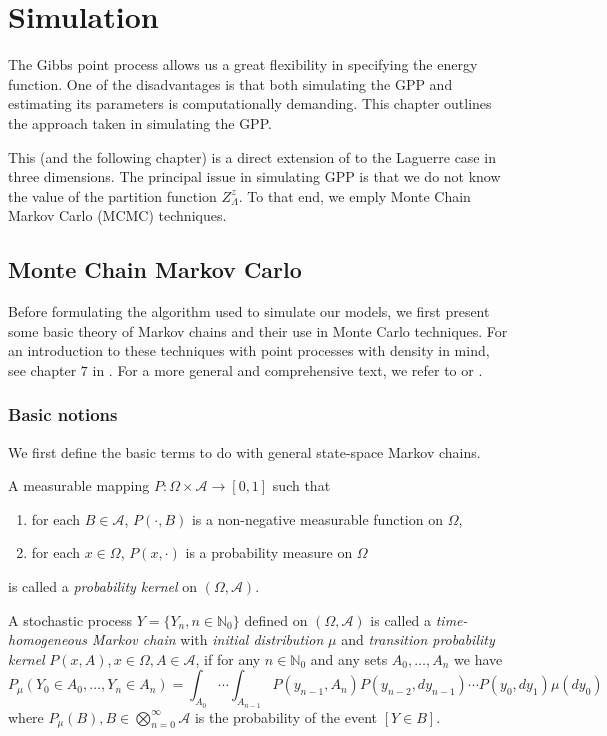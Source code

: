 \chapter{Simulation}
The Gibbs point process allows us a great flexibility in specifying the energy function. One of the disadvantages is that both simulating the GPP and estimating its parameters is computationally demanding. This chapter outlines the approach taken in simulating the GPP. 

This (and the following chapter) is a direct extension of \cite{DereudreLavancier2010} to the Laguerre case in three dimensions.
The principal issue in simulating GPP is that we do not know the value of the partition function $Z^z_\Lambda$. To that end, we emply Monte Chain Markov Carlo (MCMC) techniques.

\section{Monte Chain Markov Carlo}
Before formulating the algorithm used to simulate our models, we first present some basic theory of Markov chains and their use in Monte Carlo techniques. For an introduction to these techniques with point processes with density in mind, see chapter $7$ in \cite{MollerWaagepetersen2003}. For a more general and comprehensive text, we refer to \cite{RobertCasella2004} or \cite{MeynTweedie1993}.

\subsection{Basic notions}
We first define the basic terms to do with general state-space Markov chains.

\begin{definition}
A measurable mapping $P:\Omega\times \mathcal A \to [0,1]$ such that
\begin{enumerate}
\item for each $B \in \mathcal A$, $P(\cdot, B)$ is a non-negative measurable function on $\Omega$,
\item for each $x \in \Omega$, $P(x,\cdot)$ is a probability measure on $\Omega$
\end{enumerate}
is called a \textit{probability kernel} on $(\Omega, \mathcal A)$.
\end{definition}

\begin{definition} A stochastic process $Y=\{Y_n,n \in \mathbb N_0\}$ defined on $(\Omega,\mathcal A)$ is called a \textit{time-homogeneous Markov chain} with \textit{initial distribution} $\mu$ and \textit{transition probability kernel} $P(x,A),x\in\Omega,A \in \mathcal A$, if for any $n\in \mathbb N_0$ and any sets $A_0,\dots,A_n$ we have
$$P_\mu(Y_0\in A_0,\dots, Y_n \in A_n) = \int_{A_0} \cdots \int_{A_{n-1}} P(y_{n-1},A_n) P(y_{n-2},dy_{n-1}) \cdots P(y_0,dy_1)\mu(dy_0)$$
where $P_\mu(B), B \in \bigotimes^\infty_{n=0} \mathcal A$ is the probability of the event $[Y\in B]$.
\end{definition}

